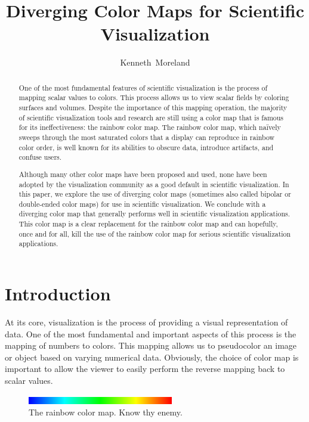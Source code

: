 \documentclass[twocolumn]{article}
\title{Diverging Color Maps for Scientific Visualization}
\author{Kenneth~Moreland}
\begin{document}
\maketitle

\begin{abstract}
  One of the most fundamental features of scientific visualization is the
  process of mapping scalar values to colors.  This process allows us to
  view scalar fields by coloring surfaces and volumes.  Despite the
  importance of this mapping operation, the majority of scientific
  visualization tools and research are still using a color map that is
  famous for its ineffectiveness: the rainbow color map.  The rainbow color
  map, which na\"{i}vely sweeps through the most saturated colors that a
  display can reproduce in rainbow color order, is well known for its
  abilities to obscure data, introduce artifacts, and confuse users.

  Although many other color maps have been proposed and used, none have
  been adopted by the visualization community as a good default in
  scientific visualization.  In this paper, we explore the use of diverging
  color maps (sometimes also called bipolar or double-ended color maps) for
  use in scientific visualization.  We conclude with a diverging color map
  that generally performs well in scientific visualization applications.
  This color map is a clear replacement for the rainbow color map and can
  hopefully, once and for all, kill the use of the rainbow color map for
  serious scientific visualization applications.
\end{abstract}

\section{Introduction}
\label{sec:Introduction}

At its core, visualization is the process of providing a visual
representation of data.  One of the most fundamental and important aspects
of this process is the mapping of numbers to colors.  This mapping allows
us to pseudocolor an image or object based on varying numerical data.
Obviously, the choice of color map is important to allow the viewer to
easily perform the reverse mapping back to scalar values.

\begin{figure}
  \centering
  \includegraphics[width=2.5in]{images/RainbowBar}
  \caption{The rainbow color map.  Know thy enemy.}
  \label{fig:RainbowColorMap}
\end{figure}
\end{document}
